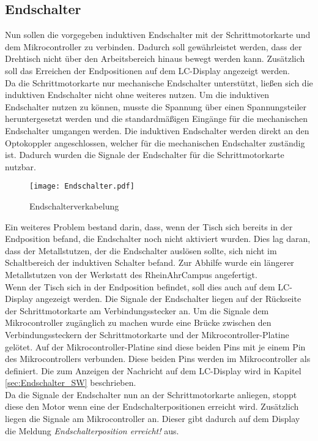 \subsection{Endschalter}
Nun sollen die vorgegeben induktiven Endschalter mit der Schrittmotorkarte und dem Mikrocontroller zu verbinden. Dadurch soll gewährleistet werden, dass der Drehtisch nicht über den Arbeitsbereich hinaus bewegt werden kann. Zusätzlich soll das Erreichen der Endpositionen auf dem LC-Display angezeigt werden.\\
Da die Schrittmotorkarte nur mechanische Endschalter unterstützt, ließen sich die induktiven Endschalter nicht ohne weiteres nutzen. Um die induktiven Endschalter nutzen zu können, musste die Spannung über einen Spannungsteiler heruntergesetzt werden und die standardmäßigen Eingänge für die mechanischen Endschalter umgangen werden. Die induktiven Endschalter werden direkt an den Optokoppler angeschlossen, welcher für die mechanischen Endschalter zuständig ist. Dadurch wurden die Signale der Endschalter für die Schrittmotorkarte nutzbar.
\begin{figure}[h]
\centering
\texttt{[image: Endschalter.pdf]}
\caption{Endschalterverkabelung}
\label{fig:Endschalterverkabelung}
\end{figure}
Ein weiteres Problem bestand darin, dass, wenn der Tisch sich bereits in der Endposition befand, die Endschalter noch nicht aktiviert wurden. Dies lag daran, dass der Metallstutzen, der die Endschalter auslösen sollte, sich nicht im Schaltbereich der induktiven Schalter befand. Zur Abhilfe wurde ein längerer Metallstutzen von der Werkstatt des RheinAhrCampus angefertigt.\\
Wenn der Tisch sich in der Endposition befindet, soll dies auch auf dem LC-Display angezeigt werden. Die Signale der Endschalter liegen auf der Rückseite der Schrittmotorkarte am Verbindungsstecker an. Um die Signale dem Mikrocontroller zugänglich zu machen wurde eine Brücke zwischen den Verbindungssteckern der Schrittmotorkarte und der Mikrocontroller-Platine gelötet. Auf der Mikrocontroller-Platine sind diese beiden Pins mit je einem Pin des Mikrocontrollers verbunden. Diese beiden Pins werden im Mikrocontroller als  definiert. Die  zum Anzeigen der Nachricht auf dem LC-Display wird in Kapitel \ref{sec:Endschalter_SW} beschrieben.\\
Da die Signale der Endschalter nun an der Schrittmotorkarte anliegen, stoppt diese den Motor wenn eine der Endschalterpositionen erreicht wird. Zusätzlich liegen die Signale am Mikrocontroller an. Dieser gibt dadurch auf dem Display die Meldung \emph{Endschalterposition erreicht!} aus.

